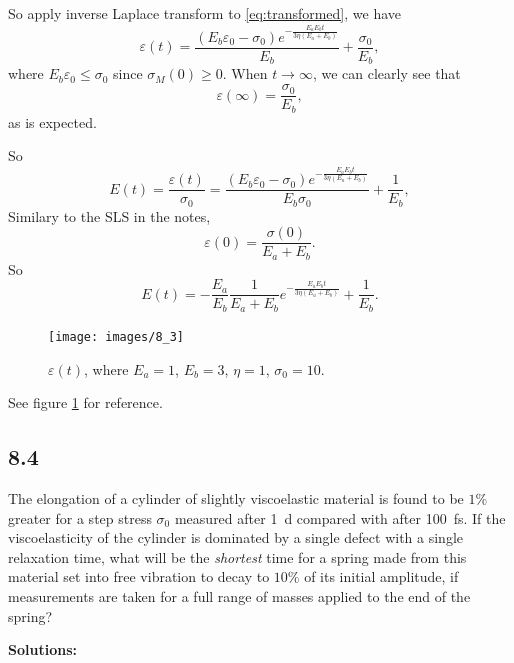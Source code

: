 \documentclass[12pt]{article}
\begin{document}
So apply inverse Laplace transform to \eqref{eq:transformed}, we have
\begin{equation}
  \varepsilon(t) = \frac{(E_b \varepsilon_0-\sigma_0) e^{-\frac{E_a E_b t}{3 \eta (E_a + E_b)}}}{E_b}+\frac{\sigma_0}{E_b},
\end{equation}
where $E_b \varepsilon_0 \leq \sigma_0$ since $\sigma_M(0) \geq 0$.
When $t \rightarrow \infty$, we can clearly see that
\begin{equation}
  \varepsilon(\infty) = \frac{\sigma_0}{E_b},
\end{equation}
as is expected.

So
\begin{equation}
  E(t) = \frac{ \varepsilon(t) }{ \sigma_0 } = \frac{(E_b \varepsilon_0-\sigma_0) e^{-\frac{E_a E_b t}{3 \eta (E_a + E_b)}}}{E_b \sigma_0}+\frac{1}{E_b},
\end{equation}
Similary to the SLS in the notes,
\begin{equation}
  \varepsilon(0) = \frac{ \sigma(0) }{ E_a + E_b }.
\end{equation}
So
\begin{equation}
  E(t) = -\frac{ E_a }{ E_b } \frac{ 1 }{ E_a + E_b } e^{-\frac{E_a E_b t}{3 \eta (E_a + E_b)}} + \frac{1}{E_b}.
\end{equation}

\begin{figure}[h]
  \centering
  \texttt{[image: images/8\_3]}
  \caption{$\varepsilon(t)$, where $E_a = 1$, $E_b = 3$, $\eta = 1$, $\sigma_0 = 10$.}
  \label{fig:question_8_3}
\end{figure}

See figure \ref{fig:question_8_3} for reference.

\subsection{8.4}
The elongation of a cylinder of slightly viscoelastic material is found to be
$1\%$ greater for a step stress $\sigma_0$ measured after \SI{1}{\day} compared with after \SI{100}{\femto\second}.
If the viscoelasticity of the cylinder is dominated by a single defect
with a single relaxation time, what will be the \emph{shortest} time for a spring made from this
material set into free vibration to decay to $10\%$ of its initial amplitude,
if measurements are taken for a full range of masses applied to the end of the spring?

\textbf{Solutions:}
\end{document}
